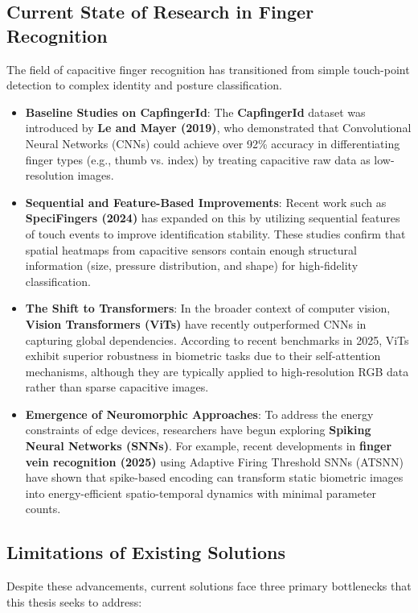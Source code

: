 \documentclass[../main.tex]{subfiles}
\begin{document}
\subsection{Current State of Research in Finger Recognition}
The field of capacitive finger recognition has transitioned from simple touch-point detection to complex identity and posture classification.

\begin{itemize}
\item \textbf{Baseline Studies on CapfingerId}: The \textbf{CapfingerId} \cite{CapfingerId} dataset was introduced by \textbf{Le and Mayer (2019)}, who demonstrated that Convolutional Neural Networks (CNNs) could achieve over 92\% accuracy in differentiating finger types (e.g., thumb vs. index) by treating capacitive raw data as low-resolution images.
\item \textbf{Sequential and Feature-Based Improvements}: Recent work such as \textbf{SpeciFingers (2024)} \cite{SpeciFingers} has expanded on this by utilizing sequential features of touch events to improve identification stability. These studies confirm that spatial heatmaps from capacitive sensors contain enough structural information (size, pressure distribution, and shape) for high-fidelity classification.
\item \textbf{The Shift to Transformers}: In the broader context of computer vision, \textbf{Vision Transformers (ViTs)} have recently outperformed CNNs in capturing global dependencies. According to recent benchmarks in 2025, ViTs exhibit superior robustness in biometric tasks due to their self-attention mechanisms, although they are typically applied to high-resolution RGB data rather than sparse capacitive images.

\item \textbf{Emergence of Neuromorphic Approaches}: To address the energy constraints of edge devices, researchers have begun exploring \textbf{Spiking Neural Networks (SNNs)}. For example, recent developments in \textbf{finger vein recognition (2025)} using Adaptive Firing Threshold SNNs (ATSNN) have shown that spike-based encoding can transform static biometric images into energy-efficient spatio-temporal dynamics with minimal parameter counts.
\end{itemize}

\subsection{Limitations of Existing Solutions}
Despite these advancements, current solutions face three primary bottlenecks that this thesis seeks to address:
\end{document}
